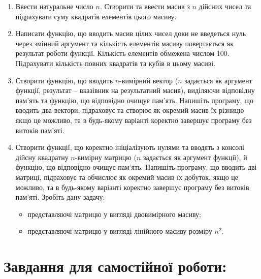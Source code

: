 \documentclass[a5paper,titlepage,openany,twoside,draft]{book_unv}%
\begin{document}
\begin{enumerate}
\def\labelenumi{\arabic{enumi})}
\item
  Ввести натуральне число $n$. Створити та ввести масив з $n$ дійсних чисел та
  підрахувати суму квадратів елементів цього масиву. 

\item
  Написати функцію, що вводить масив цілих чисел доки не введеться нуль
  через змінний аргумент та кількість елементів масиву повертається як
  результат роботи функції. Кількість елементів обмежена числом 100.
  Підрахувати кількість повних квадратів та кубів в цьому масиві.
\item
  Створити функцію, що вводить $n$-вимірний вектор ($n$
  задається як аргумент функції, результат -- вказівник на результатний масив),
 виділяючи відповідну пам'ять та функцію, що відповідно очищує пам'ять. 
 Напишіть програму, що вводить два вектори, підраховує та створює як окремий масив їх
  різницю якщо це можливо, та в будь-якому варіанті коректно
  завершує програму без витоків пам'яті.
\item
  Створити функції, що коректно ініціалізують нулями та вводять з консолі 
дійсну квадратну $n$-вимірну матрицю ($n$ задається як аргумент функції), й
  функцію, що відповідно очищує пам'ять. Напишіть програму, що вводить
  дві матриці, підраховує та обчислює як окремий масив їх добуток, якщо
  це можливо, та в будь-якому варіанті коректно завершує програму без
  витоків пам'яті. Зробіть дану задачу:
  \begin{itemize}
  \item
представляючі матрицю у вигляді двовимірного масиву;
  \item
представляючі матрицю у вигляді лінійного масиву розміру $n^{2}$.
 \end{itemize}

\end{enumerate}

\section{Завдання для самостійної роботи:}
\end{document}
